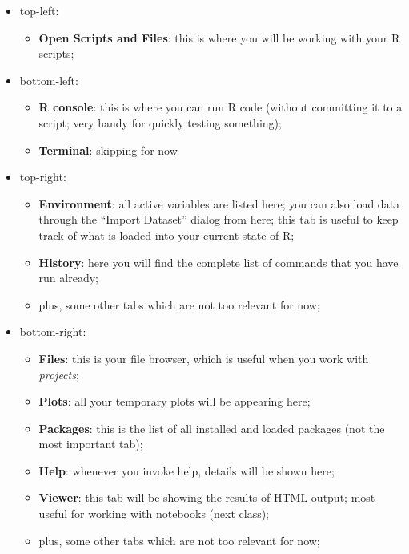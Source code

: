 \documentclass[
]{book}
\providecommand{\tightlist}{%
  \setlength{\itemsep}{0pt}\setlength{\parskip}{0pt}}
\begin{document}
\begin{itemize}
\tightlist
\item
  top-left:

  \begin{itemize}
  \tightlist
  \item
    \textbf{Open Scripts and Files}: this is where you will be working with your R scripts;
  \end{itemize}
\item
  bottom-left:

  \begin{itemize}
  \tightlist
  \item
    \textbf{R console}: this is where you can run R code (without committing it to a script; very handy for quickly testing something);
  \item
    \textbf{Terminal}: skipping for now
  \end{itemize}
\item
  top-right:

  \begin{itemize}
  \tightlist
  \item
    \textbf{Environment}: all active variables are listed here; you can also load data through the ``Import Dataset'' dialog from here; this tab is useful to keep track of what is loaded into your current state of R;
  \item
    \textbf{History}: here you will find the complete list of commands that you have run already;
  \item
    plus, some other tabs which are not too relevant for now;
  \end{itemize}
\item
  bottom-right:

  \begin{itemize}
  \tightlist
  \item
    \textbf{Files}: this is your file browser, which is useful when you work with \emph{projects};
  \item
    \textbf{Plots}: all your temporary plots will be appearing here;
  \item
    \textbf{Packages}: this is the list of all installed and loaded packages (not the most important tab);
  \item
    \textbf{Help}: whenever you invoke help, details will be shown here;
  \item
    \textbf{Viewer}: this tab will be showing the results of HTML output; most useful for working with notebooks (next class);
  \item
    plus, some other tabs which are not too relevant for now;
  \end{itemize}
\end{itemize}
\end{document}
